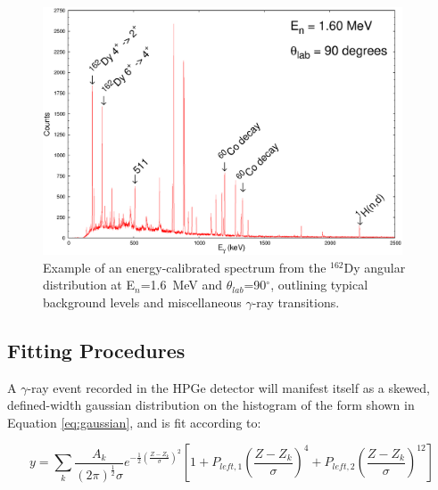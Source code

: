 \begin{figure}[h]
\begin{center}
\includegraphics[width=0.95\textwidth]{figures/samplespec.eps}
\caption{Example of an energy-calibrated spectrum from the $^{162}$Dy angular distribution at E$_n$=1.6~MeV and $\theta_{lab}$=90$^\circ$, outlining typical background levels and miscellaneous $\gamma$-ray transitions.
\label{fig:examplespec}}
\end{center}
\end{figure}

\subsection{Fitting Procedures}\label{sec:fitting_procedures}
A $\gamma$-ray event recorded in the HPGe detector will manifest itself as a skewed, defined-width gaussian distribution on the histogram of the form shown in Equation \ref{eq:gaussian}, and is fit according to:

\begin{equation}\label{eq:gaussian}
y=\sum_k \frac{A_k}{(2\pi)^\frac{1}{2}\sigma}e^{-\frac{1}{2}\left(\frac{Z-Z_k}{\sigma}\right)^2}\left[1+P_{left,1}\left(\frac{Z-Z_k}{\sigma}\right)^4+P_{left,2}\left(\frac{Z-Z_k}{\sigma}\right)^{12}\right]
\end{equation}

